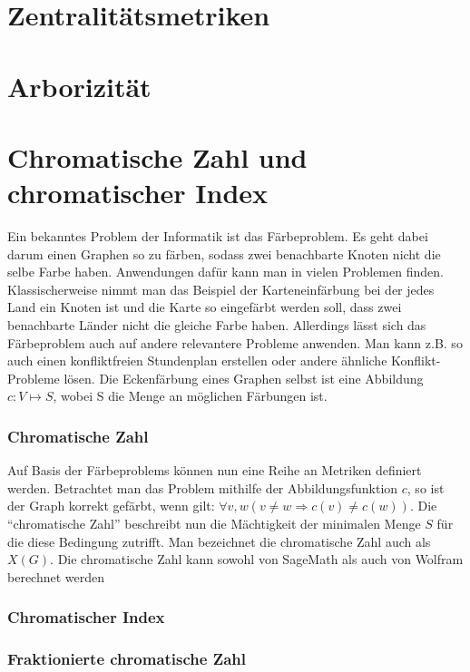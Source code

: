 \documentclass[a4paper,12pt,ngerman,chapterprefix=false,listof=totoc,bibliography=totoc]{scrreprt}
\begin{document}
\section{Zentralitätsmetriken}

\section{Arborizität}

\section{Chromatische Zahl und chromatischer Index}
{
Ein bekanntes Problem der Informatik ist das Färbeproblem. Es geht dabei darum einen Graphen so zu färben, sodass zwei benachbarte Knoten nicht die selbe Farbe haben. Anwendungen dafür kann man in vielen Problemen finden. Klassischerweise nimmt man das Beispiel der Karteneinfärbung bei der jedes Land ein Knoten ist und die Karte so eingefärbt werden soll, dass zwei benachbarte Länder nicht die gleiche Farbe haben. Allerdings lässt sich das Färbeproblem auch auf andere relevantere Probleme anwenden. Man kann z.B. so auch einen konfliktfreien Stundenplan erstellen oder andere ähnliche Konflikt-Probleme lösen. Die Eckenfärbung eines Graphen selbst ist eine Abbildung \(c: V\mapsto S\), wobei S die Menge an möglichen Färbungen ist. \cite{diestel_graphentheorie_2000,aigner_graphentheorie_2015} 
}
\subsubsection*{Chromatische Zahl}
{
Auf Basis der Färbeproblems können nun eine Reihe an Metriken definiert werden. Betrachtet man das Problem mithilfe der Abbildungsfunktion \(c\), so ist der Graph korrekt gefärbt, wenn gilt: \(\forall v, w (v\neq w \Rightarrow c(v)\neq c(w))\). Die "`chromatische Zahl"' beschreibt nun die Mächtigkeit der minimalen Menge \(S\) für die diese Bedingung zutrifft. Man bezeichnet die chromatische Zahl auch als \(X(G)\). \cite{diestel_graphentheorie_2000} Die chromatische Zahl kann sowohl von SageMath als auch von Wolfram berechnet werden \cite{sagemath_graph_2020-1,wolfram_wolfram_2020-1}
}
\subsubsection*{Chromatischer Index}

\subsubsection*{Fraktionierte chromatische Zahl}
\end{document}
